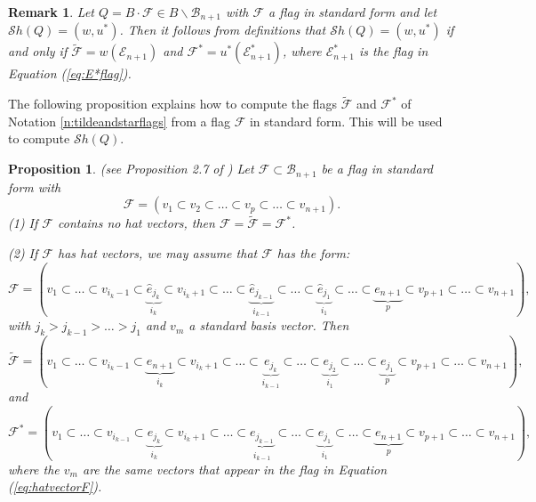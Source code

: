 \documentclass[12pt]{amsart}
\numberwithin{equation}{section}
\newtheorem{prop}[thm]{Proposition}
\newtheorem{rem}[thm]{Remark}
\newcommand{\B}{\mathcal{B}}
\newcommand{\he}{\hat{e}}
\newcommand{\F}{\mathcal{F}}
\newcommand{\Sh}{\mathcal{S}h}
\begin{document}
\begin{rem}\label{r:tildeandstarflags}
Let $Q=B\cdot \F\in B\backslash \B_{n+1}$ with $\F$ a flag in standard form and let $\Sh(Q)=(w, u^{*})$.  Then it follows from definitions that $\Sh(Q)=(w,u^{*})$ if and only if $\tilde{\F}=w(\mathcal{E}_{n+1})$ and $\F^{*}=u^{*}(\mathcal{E}^{*}_{n+1})$, where $\mathcal{E}^{*}_{n+1}$ is the flag in Equation (\ref{eq:E*flag}).
\end{rem}

The following proposition explains how to compute the flags 
$\tilde{\F}$ and $\F^{*}$ of Notation \ref{n:tildeandstarflags} from a flag $\F$ in standard form.   This will be used to compute $\Sh(Q).$


 
 \begin{prop}\label{p:orbits}(see Proposition 2.7 of \cite{Shpairs})
Let $\F\subset \B_{n+1}$ be a flag in standard form with 
$$
\F=(v_{1}\subset v_{2}\subset \dots\subset v_{p}\subset \dots\subset v_{n+1}).
$$  
(1) If $\F$ contains no hat vectors, then 
$\F=\tilde{\F}=\F^{*}$. 

\noindent (2) If $\F$ has hat vectors, we may assume that $\F$ has the form:
\begin{equation}\label{eq:hatvectorF}
\F=(v_{1}\subset\dots\subset v_{i_{k}-1}\subset\underbrace{ \he_{j_{k}}}_{i_{k}}\subset v_{i_{k}+1}\subset \dots \subset \underbrace{\he_{j_{k-1}}}_{i_{k-1}}\subset \dots \subset \underbrace{\he_{j_{1}}}_{i_{1}}\subset \dots\subset \underbrace{e_{n+1}}_{p}\subset v_{p+1}\subset \dots\subset v_{n+1}),
\end{equation}
with $j_{k}>j_{k-1}>\dots>j_{1}$ and $v_{m}$ a standard basis vector.  
Then
\begin{equation}\label{eq:tildeF}
\tilde{\F}=(v_{1}\subset\dots\subset v_{i_{k}-1}\subset\underbrace{e_{n+1}}_{i_{k}}\subset v_{i_{k}+1}\subset \dots\subset \underbrace{e_{j_{k}}}_{i_{k-1}}\subset\dots\subset \underbrace{e_{j_{2}}}_{i_{1}}\subset \dots\subset\underbrace{e_{j_{1}}}_{p}\subset v_{p+1}\subset\dots\subset v_{n+1}),
\end{equation}
and 
\begin{equation}\label{eq:starF}
\F^{*}=(v_{1}\subset \dots\subset v_{i_{k-1}}\subset \underbrace{e_{j_{k}}}_{i_{k}}\subset v_{i_{k}+1}\subset \dots\subset \underbrace{e_{j_{k-1}}}_{i_{k-1}}\subset \dots\subset \underbrace{e_{j_{1}}}_{i_{1}}\subset \dots\subset\underbrace{e_{n+1}}_{p}\subset v_{p+1}\subset \dots\subset v_{n+1}),
\end{equation}
where the $v_{m}$ are the same vectors that appear in the flag in Equation (\ref{eq:hatvectorF}).
\end{prop}
\end{document}
